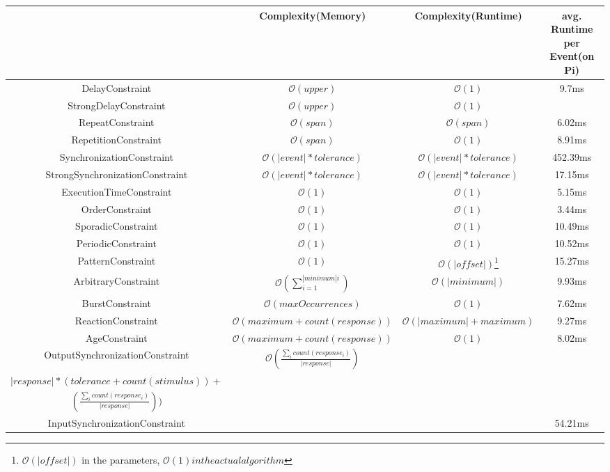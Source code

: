 	\begin{landscape}
		\begin{table}
			\begin{tabular}{|c|c|c|c|}
				\hline
				& Complexity(Memory) & Complexity(Runtime) & avg. Runtime per Event(on Pi)\\
				\hline
				DelayConstraint					&$\mathcal{O}(upper)$&$\mathcal{O}(1)$&9.7ms\\
				\hline
				StrongDelayConstraint			&$\mathcal{O}(upper)$&$\mathcal{O}(1)$&\\
				\hline
				RepeatConstraint				&$\mathcal{O}(span)$&$\mathcal{O}(span)$&6.02ms\\
				\hline
				RepetitionConstraint			&$\mathcal{O}(span)$&$\mathcal{O}(1)$&8.91ms\\
				\hline
				SynchronizationConstraint		&$\mathcal{O}(|event|*tolerance)$&$\mathcal{O}(|event|*tolerance)$&452.39ms\\
				\hline
				StrongSynchronizationConstraint &$\mathcal{O}(|event|*tolerance)$&$\mathcal{O}(|event|*tolerance)$&17.15ms\\
				\hline
				ExecutionTimeConstraint			&$\mathcal{O}(1)$&$\mathcal{O}(1)$&5.15ms\\
				\hline
				OrderConstraint					&$\mathcal{O}(1)$&$\mathcal{O}(1)$&3.44ms\\
				\hline
				SporadicConstraint				&$\mathcal{O}(1)$&$\mathcal{O}(1)$&10.49ms\\
				\hline
				PeriodicConstraint				&$\mathcal{O}(1)$&$\mathcal{O}(1)$&10.52ms\\
				\hline
				PatternConstraint				&$\mathcal{O}(1)$&$\mathcal{O}(|offset|)$\footnote{$\mathcal{O}(|offset|)$ in the parameters, $\mathcal{O}(1) in the actual algorithm$}&15.27ms\\
				\hline
				ArbitraryConstraint				&$\mathcal{O}(\sum_{i=1}^{|minimum|i})$&$\mathcal{O}(|minimum|)$&9.93ms\\
				\hline
				BurstConstraint					&$\mathcal{O}(maxOccurrences)$&$\mathcal{O}(1)$&7.62ms\\
				\hline
				ReactionConstraint				&$\mathcal{O}(maximum+count(response))$&$\mathcal{O}(|maximum| + maximum)$&9.27ms\\
				\hline
				AgeConstraint					&$\mathcal{O}(maximum+count(response))$&$\mathcal{O}(1)$&8.02ms\\
				\hline
				OutputSynchronizationConstraint	&$\mathcal{O}\left(\frac{\sum_i count(response_i)}{|response|}\right)$ & \makecell{ $\mathcal{O}(tolerance^2+$\\$|response|*(tolerance+count(stimulus))+$\\$\left(\frac{\sum_i count(response_i)}{|response|}\right))$}&\\
				\hline
				InputSynchronizationConstraint	&&&54.21ms\\
				\hline
			\end{tabular}
			\label{tab:evalOverview}
		\end{table}
	\end{landscape}
	
	
	
	

	
	
